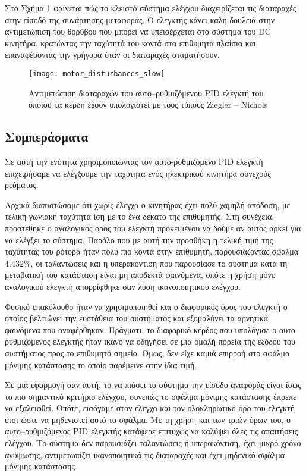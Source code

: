 Στο Σχήμα \ref{fig:motor_disturbances_slow} φαίνεται πώς το κλειστό σύστημα ελέγχου διαχειρίζεται τις διαταραχές στην είσοδό της συνάρτησης μεταφοράς. Ο ελεγκτής κάνει καλή δουλειά στην αντιμετώπιση του θορύβου που μπορεί να υπεισέρχεται στο σύστημα του DC κινητήρα, κρατώντας την ταχύτητά του κοντά στα επιθυμητά πλαίσια και επαναφέροντάς την γρήγορα όταν οι διαταραχές σταματήσουν.

\begin{figure}[h]
  \centering
  \texttt{[image: motor\_disturbances\_slow]}
  \caption{Αντιμετώπιση διαταραχών του αυτο--ρυθμιζόμενου PID ελεγκτή του οποίου τα κέρδη έχουν υπολογιστεί με τους τύπους Ziegler -- Nichols}
  \label{fig:motor_disturbances_slow}
\end{figure}

\subsection{Συμπεράσματα}

Σε αυτή την ενότητα χρησιμοποιώντας τον αυτο-ρυθμιζόμενο PID ελεγκτή επιχειρήσαμε να ελέγξουμε την ταχύτητα ενός ηλεκτρικού κινητήρα συνεχούς ρεύματος.

Αρχικά διαπιστώσαμε ότι χωρίς έλεγχο ο κινητήρας έχει πολύ χαμηλή απόδοση, με τελική γωνιακή ταχύτητα ίση με το ένα δέκατο της επιθυμητής. Στη συνέχεια, προστέθηκε ο αναλογικός όρος του ελεγκτή προκειμένου να δούμε αν αυτός αρκεί για να ελέγξει το σύστημα. Παρόλο που με αυτή την προσθήκη η τελική τιμή της ταχύτητας του ρότορα ήταν πολύ πιο κοντά στην επιθυμητή, παρουσιάζοντας σφάλμα $4.432\%$, οι ταλαντώσεις και η υπερακόντιση που παρουσίασε το σύστημα κατά τη μεταβατική του κατάσταση είναι μη αποδεκτά φαινόμενα, οπότε η χρήση μόνο αναλογικού ελεγκτή απορρίφθηκε σαν λύση ικανοποιητικού ελέγχου.

Φυσικό επακόλουθο ήταν να χρησιμοποιηθεί και ο διαφορικός όρος του ελεγκτή ο οποίος βελτιώνει την ευστάθεια του συστήματος και εξομαλύνει τα αρνητικά φαινόμενα που αναφέρθηκαν. Πράγματι, το διαφορικό κέρδος που υπολόγισε ο αυτο--ρυθμιζόμενος ελεγκτής ήταν ικανό να οδηγήσει σε μια ομαλή πορεία της εξόδου του συστήματος προς το επιθυμητό σημείο. Όμως, δεν είχε καμιά επιρροή στο σφάλμα μόνιμης κατάστασης το οποίο παρέμεινε στην ίδια τιμή.

Σε μια εφαρμογή σαν αυτή, το να πιάσει το σύστημα την είσοδο αναφοράς είναι ίσως το πιο σημαντικό κριτήριο ελέγχου, συνεπώς το σφάλμα μόνιμης κατάστασης έπρεπε να εξαλειφθεί. Οπότε, εισάγαμε στον έλεγχο και τον ολοκληρωτικό όρο του ελεγκτή έτσι ώστε να μηδενιστεί αυτό το σφάλμα. Με τη χρήση και των τριών όρων του, ο αυτο--ρυθμιζόμενος PID ελεγκτής κατάφερε επιτυχώς να καλύψει όλες τις απαιτήσεις ελέγχου. Το σύστημα δεν παρουσιάζει ταλαντώσεις ή υπερακόντιση, έχει μικρό χρόνο ανύψωσης, αντιμετωπίζει ικανοποιητικά τις διαταραχές και έχει μηδενικό σφάλμα μόνιμης κατάστασης.

